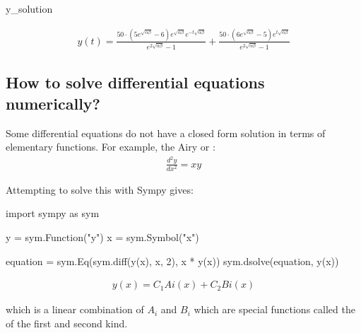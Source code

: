 \begin{pyin}
y_solution
\end{pyin}




\begin{equation*}
\begin{split}\displaystyle y{\left(t \right)} = \frac{50 \cdot \left(5 e^{\sqrt{\alpha \beta}} - 6\right) e^{\sqrt{\alpha \beta}} e^{- t \sqrt{\alpha \beta}}}{e^{2 \sqrt{\alpha \beta}} - 1} + \frac{50 \cdot \left(6 e^{\sqrt{\alpha \beta}} - 5\right) e^{t \sqrt{\alpha \beta}}}{e^{2 \sqrt{\alpha \beta}} - 1}\end{split}
\end{equation*}




\subsection{How to solve differential equations numerically?}
\label{\detokenize{tools-for-mathematics/09-differential-equations/why/main:how-to-solve-differential-equations-numerically}}

Some differential equations do not have a closed form solution in terms of
elementary functions. For example, the Airy or :
\begin{equation*}
\begin{split}
\frac{d^2y}{dx^2} = xy
\end{split}
\end{equation*}

Attempting to solve this with Sympy gives:




\begin{pyin}
import sympy as sym

y = sym.Function("y")
x = sym.Symbol("x")

equation = sym.Eq(sym.diff(y(x), x, 2), x * y(x))
sym.dsolve(equation, y(x))
\end{pyin}




\begin{equation*}
\begin{split}\displaystyle y{\left(x \right)} = C_{1} Ai\left(x\right) + C_{2} Bi\left(x\right)\end{split}
\end{equation*}




which is a linear combination of \(A_i\) and \(B_i\) which are special functions
called the  of the first and second kind.


